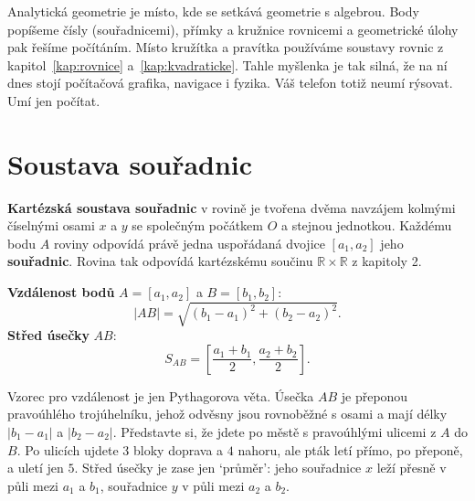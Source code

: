 \label{kap:analyticka}

Analytická geometrie je místo, kde se setkává geometrie s algebrou. Body popíšeme čísly (souřadnicemi), přímky a kružnice rovnicemi a geometrické úlohy pak řešíme počítáním. Místo kružítka a pravítka používáme soustavy rovnic z kapitol~\ref{kap:rovnice} a~\ref{kap:kvadraticke}. Tahle myšlenka je tak silná, že na ní dnes stojí počítačová grafika, navigace i fyzika. Váš telefon totiž neumí rýsovat. Umí jen počítat.

\section{Soustava souřadnic}\label{sec:soustava-souradnic}

\begin{definitionbox}
  \textbf{Kartézská soustava souřadnic} v rovině je tvořena dvěma navzájem kolmými číselnými osami $x$ a $y$ se společným počátkem $O$ a stejnou jednotkou. Každému bodu $A$ roviny odpovídá právě jedna uspořádaná dvojice $[a_1, a_2]$ jeho \textbf{souřadnic}. Rovina tak odpovídá kartézskému součinu $\mathbb{R}\times\mathbb{R}$ z kapitoly 2.

  \vspace{0.2cm}

  \textbf{Vzdálenost bodů} $A = [a_1, a_2]$ a $B = [b_1, b_2]$:
  \begin{equation*}
    |AB| = \sqrt{{(b_1 - a_1)}^2 + {(b_2 - a_2)}^2}.
  \end{equation*}
  \textbf{Střed úsečky} $AB$:
  \begin{equation*}
    S_{AB} = \left[\frac{a_1 + b_1}{2}, \frac{a_2 + b_2}{2}\right].
  \end{equation*}
\end{definitionbox}

Vzorec pro vzdálenost je jen Pythagorova věta. Úsečka $AB$ je přeponou pravoúhlého trojúhelníku, jehož odvěsny jsou rovnoběžné s osami a mají délky $|b_1 - a_1|$ a $|b_2 - a_2|$.
Představte si, že jdete po městě s pravoúhlými ulicemi z $A$ do $B$. Po ulicích ujdete $3$ bloky doprava a $4$ nahoru, ale pták letí přímo, po přeponě, a uletí jen $5$. Střed úsečky je zase jen `průměr': jeho souřadnice $x$ leží přesně v půli mezi $a_1$ a $b_1$, souřadnice $y$ v půli mezi $a_2$ a $b_2$.

